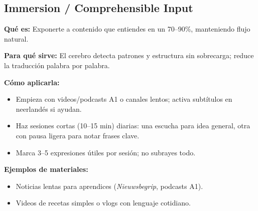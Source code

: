 \subsection*{Immersion / Comprehensible Input}
\textbf{Qué es:} Exponerte a contenido que entiendes en un 70--90\%, manteniendo flujo natural.

\textbf{Para qué sirve:} El cerebro detecta patrones y estructura sin sobrecarga; reduce la traducción palabra por palabra.

\textbf{Cómo aplicarla:}
\begin{itemize}[leftmargin=*]
	\item Empieza con videos/podcasts A1 o canales lentos; activa subtítulos en neerlandés si ayudan.
	\item Haz sesiones cortas (10--15 min) diarias: una escucha para idea general, otra con pausa ligera para notar frases clave.
	\item Marca 3--5 expresiones útiles por sesión; no subrayes todo.
\end{itemize}

\textbf{Ejemplos de materiales:}
\begin{itemize}[leftmargin=*]
	\item Noticias lentas para aprendices (\textit{Nieuwsbegrip}, podcasts A1).
	\item Videos de recetas simples o vlogs con lenguaje cotidiano.
\end{itemize}
